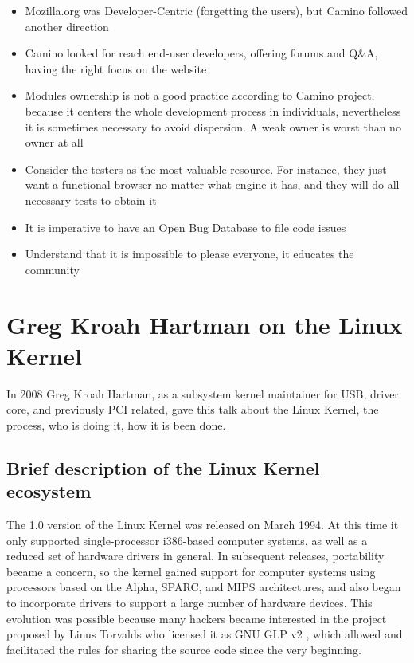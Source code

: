 \documentclass[11pt]{article} %
\begin{document}
\begin{itemize}
  	  \item Mozilla.org was Developer-Centric (forgetting the users), but Camino followed another direction
  	  \item Camino looked for reach end-user developers, offering forums and Q\&A, having the right focus on the website
  	  \item Modules ownership is not a good practice according to Camino project, because it centers the whole development process in individuals, nevertheless it is sometimes necessary to avoid dispersion. A weak owner is worst than no owner at all
  	  \item Consider the testers as the most valuable resource. For instance, they just want a functional browser no matter what engine it has, and they will do all necessary tests to obtain it
  	  \item It is imperative to have an Open Bug Database to file code issues
  	  \item Understand that it is impossible to please everyone, it educates the community
  	\end{itemize}

\section{Greg Kroah Hartman on the Linux Kernel}

In 2008 Greg Kroah Hartman, as a subsystem kernel maintainer for USB, driver core, and previously PCI related, gave this talk about the Linux Kernel, the process, who is doing it, how it is been done.

\subsection{Brief description of the Linux Kernel ecosystem}

The 1.0 version of the Linux Kernel was released on March 1994. At this time it only supported single-processor i386-based computer systems, as well as a reduced set of hardware drivers in general. In subsequent releases, portability became a concern, so the kernel gained support for computer systems using processors based on the Alpha, SPARC, and MIPS architectures, and also began to incorporate drivers to support a large number of hardware devices. This evolution was possible because many hackers became interested in the project proposed by Linus Torvalds who licensed it as GNU GLP v2 \cite{Torvalds:1991lt}, which allowed and facilitated the rules for sharing the source code since the very beginning.
\end{document}
